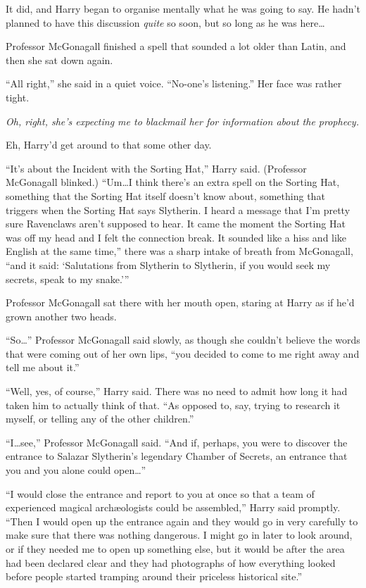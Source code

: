 It did, and Harry began to organise mentally what he was going to say. He hadn’t planned to have this discussion \emph{quite} so soon, but so long as he was here…

Professor McGonagall finished a spell that sounded a lot older than Latin, and then she sat down again.

“All right,” she said in a quiet voice. “No-one’s listening.” Her face was rather tight.

\emph{Oh, right, she’s expecting me to blackmail her for information about the prophecy.}

Eh, Harry’d get around to that some other day.

“It’s about the Incident with the Sorting Hat,” Harry said. (Professor McGonagall blinked.) “Um…I think there’s an extra spell on the Sorting Hat, something that the Sorting Hat itself doesn’t know about, something that triggers when the Sorting Hat says Slytherin. I heard a message that I’m pretty sure Ravenclaws aren’t supposed to hear. It came the moment the Sorting Hat was off my head and I felt the connection break. It sounded like a hiss and like English at the same time,” there was a sharp intake of breath from McGonagall, “and it said: ‘Salutations from Slytherin to Slytherin, if you would seek my secrets, speak to my snake.’{}”

Professor McGonagall sat there with her mouth open, staring at Harry as if he’d grown another two heads.

“So…” Professor McGonagall said slowly, as though she couldn’t believe the words that were coming out of her own lips, “you decided to come to me right away and tell me about it.”

“Well, yes, of course,” Harry said. There was no need to admit how long it had taken him to actually think of that. “As opposed to, say, trying to research it myself, or telling any of the other children.”

“I…see,” Professor McGonagall said. “And if, perhaps, you were to discover the entrance to Salazar Slytherin’s legendary Chamber of Secrets, an entrance that you and you alone could open…”

“I would close the entrance and report to you at once so that a team of experienced magical archæologists could be assembled,” Harry said promptly. “Then I would open up the entrance again and they would go in very carefully to make sure that there was nothing dangerous. I might go in later to look around, or if they needed me to open up something else, but it would be after the area had been declared clear and they had photographs of how everything looked before people started tramping around their priceless historical site.”

